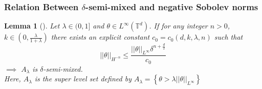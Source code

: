 \documentclass[12pt]{report}   %
\renewcommand{\leq}{\leqslant}
\numberwithin{equation}{section}
\theoremstyle{plain}
\newtheorem{lemma}{Lemma}[section]
\theoremstyle{definition}
\theoremstyle{remark}
\begin{document}
 \subsubsection{Relation Between $\delta$-semi-mixed and negative Sobolev norms} 
\begin{lemma}[{\cite[Lemma~2.2]{IyerKiselevEA14}}]\label{lemmadelta}
 Let $\lambda\in (0,1]$ and $\theta\in L^\infty(\mathbb{T}^d)$. If for any integer $n>0$, $k\in\left(0, \frac{\lambda}{1+\lambda}\right)$ there exists an explicit constant $c_0 = c_0(d,k,\lambda, n)$ such that 
\begin{equation}
||\theta||_{H^{-n}} \leq \frac{||\theta||_{L^\infty} \delta^{n+\frac{d}{2}}}{c_0}
\end{equation}
$\implies$ $A_\lambda$ is $\delta$-semi-mixed. \\
Here, $A_\lambda$ is the super level set defined by $A_\lambda = \left\lbrace \theta > \lambda||\theta||_{L^\infty} \right\rbrace $
\end{lemma}
\end{document}
